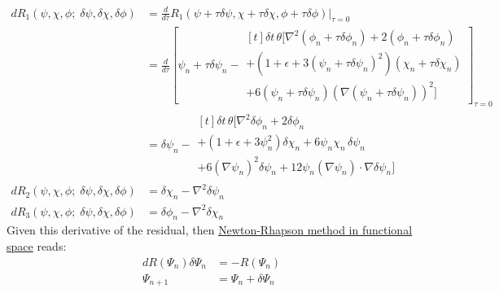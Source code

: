 \documentclass[reqno]{article}
\begin{document}
\begin{equation}
    \begin{split}
    dR_1(\psi, \chi, \phi; \; \delta \psi, \delta \chi, \delta \phi)
    &=
    \frac{d}{d \tau} R_1(\psi + \tau \delta \psi, \chi + \tau \delta \chi, \phi + \tau \delta \phi) \biggr|_{\tau = 0} \\
    &=
    \frac{d}{d\tau}
    \left[
    \psi_n + \tau \delta \psi_n
    - 
    \begin{multlined}[t]
        \delta t \, \theta \bigl[
        \nabla^2 \left(\phi_n + \tau \delta \phi_n \right)
        + 2 \left( \phi_n + \tau \delta \phi_n \right) \\
        + \left(1 + \epsilon + 3 \left(\psi_n + \tau \delta \psi_n\right)^2 \right) \left( \chi_n + \tau \delta \chi_n \right) \\
        + 6 \left( \psi_n + \tau \delta \psi_n \right) \left(\nabla \left( \psi_n + \tau \delta \psi_n \right) \right)^2
    \bigr] 
    \end{multlined}
    \right]_{\tau = 0} \\
    &=
    \delta \psi_n
    - 
    \begin{multlined}[t]
        \delta t \, \theta \bigl[
        \nabla^2 \delta \phi_n
        + 2 \delta \phi_n \\
        + \left(1 + \epsilon + 3 \psi_n^2 \right) \delta \chi_n
        + 6 \psi_n \chi_n \, \delta \psi_n \\
        + 6 \left(\nabla \psi_n\right)^2 \delta \psi_n
        + 12 \psi_n \left(\nabla \psi_n \right) \cdot \nabla \delta \psi_n
    \bigr]
    \end{multlined} \\
    dR_2(\psi, \chi, \phi; \; \delta \psi, \delta \chi, \delta \phi)
    &=
    \delta \chi_n - \nabla^2 \delta \psi_n \\
    dR_3(\psi, \chi, \phi; \; \delta \psi, \delta \chi, \delta \phi)
    &=
    \delta \phi_n - \nabla^2 \delta \chi_n
    \end{split}
\end{equation}
Given this derivative of the residual, then \href{https://www.wikiwand.com/en/Newton's_method#In_a_Banach_space}{Newton-Rhapson method in functional space} reads:
\begin{equation}
    \begin{split}
        dR(\Psi_n) \delta \Psi_n
        &= -R(\Psi_n) \\
        \Psi_{n + 1} 
        &= \Psi_n + \delta \Psi_n
    \end{split}
\end{equation}
\end{document}
